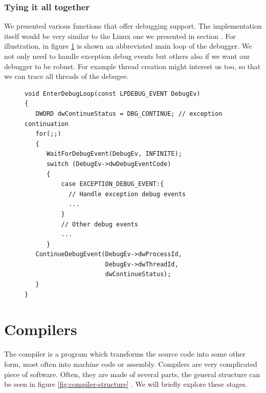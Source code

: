 \subsubsection*{Tying it all together}
We presented various functions that offer debugging support. The implementation
itself would be very similar to the Linux one we presented in section
. For illustration, in figure \ref{fig:windows-debugger-mainloop} is
shown an abbreviated main loop of the debugger. We not only need to handle
exception debug events but others also if we want our debugger to be robust.
For example thread creation might interest us too, so that we can trace all
threads of the debugee.

\begin{figure}\label{fig:windows-debugger-mainloop}
    \begin{verbatim}
void EnterDebugLoop(const LPDEBUG_EVENT DebugEv)
{
   DWORD dwContinueStatus = DBG_CONTINUE; // exception continuation
   for(;;)
   {
      WaitForDebugEvent(DebugEv, INFINITE);
      switch (DebugEv->dwDebugEventCode)
      {
          case EXCEPTION_DEBUG_EVENT:{
            // Handle exception debug events
            ...
          }
          // Other debug events
          ...
      }
   ContinueDebugEvent(DebugEv->dwProcessId,
                      DebugEv->dwThreadId,
                      dwContinueStatus);
   }
}
    \end{verbatim}
\end{figure}

\section{Compilers}
The compiler is a program which transforms the source code into some other
form, most often into machine code or assembly. Compilers are very complicated
piece of software. Often, they are made of several parts, the general structure
can be seen in figure \ref{fig:compiler-structure} \cite{dragon-book}. We will
briefly explore these stages.

